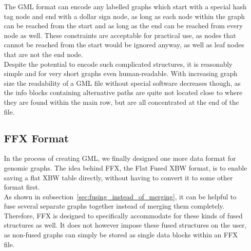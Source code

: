 \documentclass[a4paper,12pt,twoside,BCOR=10mm]{scrbook}
\begin{document}
%

The GML format can encode any labelled graphs which start with a special hash tag node 
and end with a dollar sign node, as long as each node within the graph 
can be reached from the start and as long as the end can be reached from 
every node as well. These constraints are acceptable for practical use, 
as nodes that cannot be reached from the start would be ignored anyway, 
as well as leaf nodes that are not the end node. \\
Despite the potential to encode such complicated structures, it is reasonably 
simple and for very short graphs even human-readable. 
With increasing graph size the readability of a GML file without special software 
decreases though, as the info blocks containing alternative paths are quite not 
located close to where they are found within the main row, but are all concentrated at the end of the file.

\subsection{FFX Format}

In the process of creating GML, we finally designed one more data format for 
genomic graphs. The idea behind FFX, the Flat Fused XBW format, is to enable saving 
a flat XBW table directly, without having to convert it to some other format 
first. \\
As shown in subsection~\ref{sec:fusing_instead_of_merging}, 
it can be helpful to fuse several separate graphs together 
instead of merging them completely. Therefore, FFX is designed 
to specifically accommodate for these kinds of fused structures as well. 
It does not however impose these fused structures on the user, 
as non-fused graphs can simply be stored as single data blocks within 
an FFX file.
\end{document}
